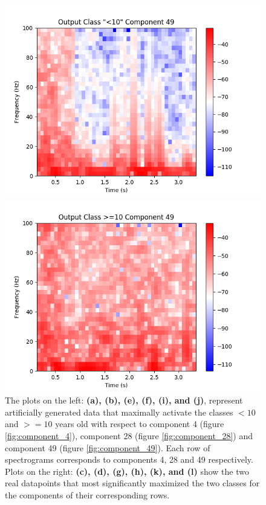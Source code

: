 \documentclass[fleqn,10pt]{wlscirep}
\begin{document}
\begin{figure}[t!]
\begin{minipage}{0.24\textwidth}
    \includegraphics[width=\linewidth]{max_act/real_0_49.png}
    \subcaption{}
  \end{minipage}
  \hspace*{\fill} 
  \begin{minipage}{0.24\textwidth}
    \includegraphics[width=\linewidth]{max_act/real_1_49.png}
    \subcaption{}
  \end{minipage}
  \caption{The plots on the left: \textbf{(a), (b), (e), (f), (i), and (j)}, represent artificially generated data that maximally activate the classes $<10$ and $>=10$ years old with respect to component 4 (figure \ref{fig:component_4}), component 28 (figure \ref{fig:component_28}) and component 49 (figure \ref{fig:component_49}). Each row of spectrograms corresponds to components 4, 28 and 49 respectively. Plots on the right: \textbf{(c), (d), (g), (h), (k), and (l)} show the two real datapoints that most significantly maximized the two classes for the components of their corresponding rows.} \label{fig:max_spectrograms}
\end{figure}
\end{document}
